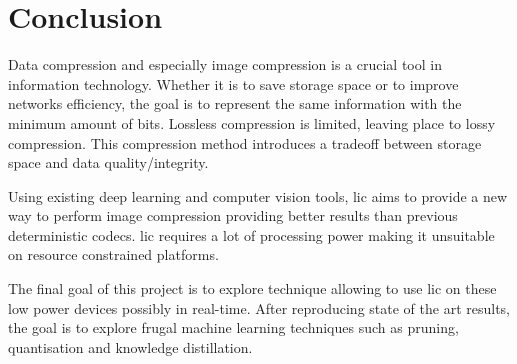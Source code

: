 \chapter*{Conclusion}
Data compression and especially image compression is a crucial tool in information technology. Whether it is to save storage space or to improve networks efficiency, the goal is to represent the same information with the minimum amount of bits. Lossless compression is limited, leaving place to lossy compression. This compression method introduces a tradeoff between storage space and data quality/integrity.

Using existing deep learning and computer vision tools, \acrfull{lic} aims to provide a new way to perform image compression providing better results than previous deterministic codecs. \acrshort{lic} requires a lot of processing power making it unsuitable on resource constrained platforms.

The final goal of this project is to explore technique allowing to use \acrshort{lic} on these low power devices possibly in real-time. After reproducing state of the art results, the goal is to explore frugal machine learning techniques such as pruning, quantisation and knowledge distillation.